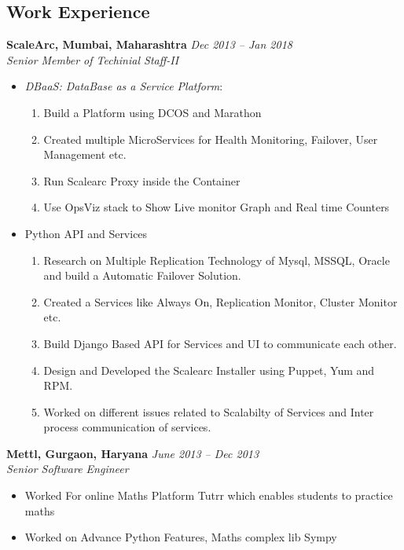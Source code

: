 \documentclass[margin,line]{resume}
\begin{document}
\begin{resume}
    \section{\mysidestyle Work Experience}

    \textbf{ScaleArc, Mumbai, Maharashtra }\hfill \textsl{Dec 2013 -- Jan 2018}\vspace{0mm}\\\vspace{0mm}%
    \textsl{Senior Member of Techinial Staff-II}      \begin{itemize}
    \item \textsl{DBaaS: DataBase as a Service Platform}: 
    \begin{enumerate}
    \item Build a Platform using DCOS and Marathon
    \item Created multiple MicroServices for Health Monitoring, Failover, User Management etc.
    \item Run Scalearc Proxy inside the Container
    \item Use OpsViz stack to Show Live monitor Graph and Real time Counters
    \end{enumerate}
    
    \item Python API and Services
    \begin{enumerate}
    \item Research on Multiple Replication Technology of Mysql, MSSQL, Oracle and build a Automatic Failover Solution.  
    \item Created a Services like Always On, Replication Monitor, Cluster Monitor etc.
    \item Build Django Based API for Services and UI to communicate each other.
    \item Design and Developed the Scalearc Installer using Puppet, Yum and RPM.
    \item Worked on different issues related to Scalabilty of Services and Inter process communication of services.
    \end{enumerate}
    \end{itemize}
      
    \textbf{Mettl, Gurgaon, Haryana }\hfill \textsl{June 2013 -- Dec 2013}\vspace{0mm}\\\vspace{0mm}%
    \textsl{Senior Software Engineer}   
    \begin{itemize}
    \item Worked For online Maths Platform Tutrr which enables students to practice maths
    \item Worked on Advance Python Features, Maths complex lib Sympy
    \end{itemize}
    

\end{resume}
\end{document}

